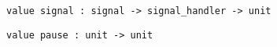 %
\begin{comment}
 Send a signal to the process with the given process id. 
\end{comment}
\begin{verbatim}
value signal : signal -> signal_handler -> unit
\end{verbatim}
%
\begin{comment}
 Set the behavior to be taken on receipt of the given signal. 
\end{comment}
\begin{verbatim}
value pause : unit -> unit
\end{verbatim}
%
\begin{comment}
 Wait until a non-ignored signal is delivered. 
\end{comment}

